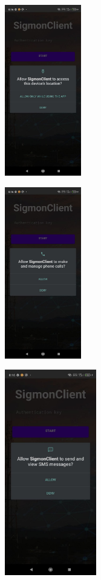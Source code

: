 \documentclass{article}
\begin{document}
\includegraphics[width=0.25\textwidth]{p1.jpg}\par\vspace{1cm}
\includegraphics[width=0.25\textwidth]{p2.jpg}\par\vspace{1cm}
\includegraphics[width=0.3\textwidth]{p3.jpg}\par\vspace{1cm}
\end{document}
